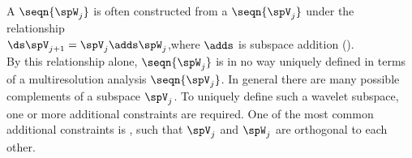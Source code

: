 

A  $\seqn{\spW_j}$ is often constructed from a  
$\seqn{\spV_j}$ under the relationship
\\\indentx$\ds\spV_{j+1} = \spV_j \adds \spW_j$,\qquad where $\adds$ is subspace addition ().\\
By this relationship alone, $\seqn{\spW_j}$ is in no way uniquely defined 
in terms of a multiresolution analysis $\seqn{\spV_j}$.
In general there are many possible complements of a subspace $\spV_j$.
To uniquely define such a wavelet subspace, one or more additional constraints are required.
One of the most common additional constraints is , such that
$\spV_j$ and $\spW_j$ are orthogonal to each other.




